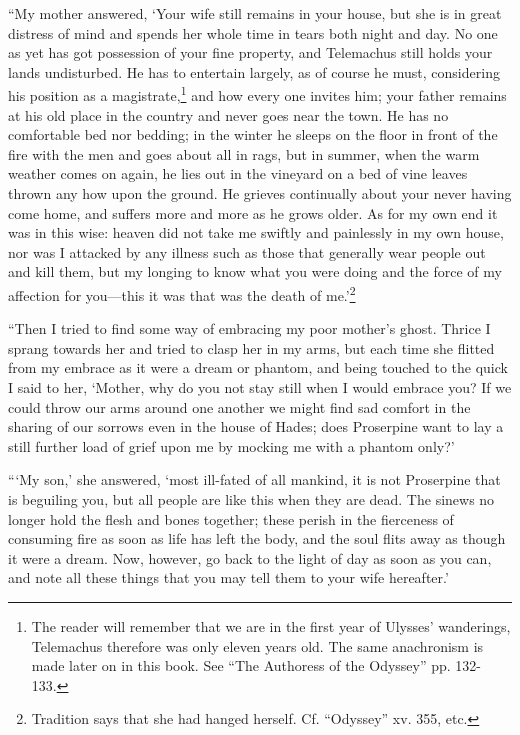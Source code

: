 “My mother answered, ‘Your wife still remains in your house, but she is in
great distress of mind and spends her whole time in tears both night and day.
No one as yet has got possession of your fine property, and Telemachus still
holds your lands undisturbed. He has to entertain largely, as of course he
must, considering his position as a magistrate,\footnote{The reader will remember that we are in the first year of Ulysses’
wanderings, Telemachus therefore was only eleven years old. The same
anachronism is made later on in this book. See “The Authoress of the Odyssey”
pp. 132-133.} and how every one invites him; your
father remains at his old place in the country and never goes near the town. He
has no comfortable bed nor bedding; in the winter he sleeps on the floor in
front of the fire with the men and goes about all in rags, but in summer, when
the warm weather comes on again, he lies out in the vineyard on a bed of vine
leaves thrown any how upon the ground. He grieves continually about your never
having come home, and suffers more and more as he grows older. As for my own
end it was in this wise: heaven did not take me swiftly and painlessly in my
own house, nor was I attacked by any illness such as those that generally wear
people out and kill them, but my longing to know what you were doing and the
force of my affection for you—this it was that was the death of me.’\footnote{Tradition says that she had hanged herself. Cf. “Odyssey” xv. 355, etc.}

“Then I tried to find some way of embracing my poor mother’s ghost. Thrice I
sprang towards her and tried to clasp her in my arms, but each time she flitted
from my embrace as it were a dream or phantom, and being touched to the quick I
said to her, ‘Mother, why do you not stay still when I would embrace you? If we
could throw our arms around one another we might find sad comfort in the
sharing of our sorrows even in the house of Hades; does Proserpine want to lay
a still further load of grief upon me by mocking me with a phantom only?’

“‘My son,’ she answered, ‘most ill-fated of all mankind, it is not Proserpine
that is beguiling you, but all people are like this when they are dead. The
sinews no longer hold the flesh and bones together; these perish in the
fierceness of consuming fire as soon as life has left the body, and the soul
flits away as though it were a dream. Now, however, go back to the light of day
as soon as you can, and note all these things that you may tell them to your
wife hereafter.’

